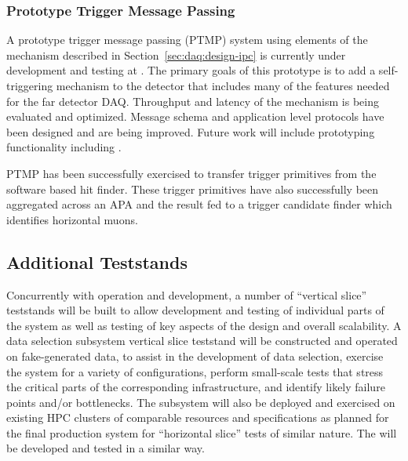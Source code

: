 \subsubsection{Prototype Trigger Message Passing}

A prototype trigger message passing (PTMP) system using elements of the  mechanism described in Section~\ref{sec:daq:design-ipc} is currently under development and testing at .
The primary goals of this prototype is to add a self-triggering mechanism to the  detector that includes many of the features needed for the far detector DAQ.
Throughput and latency of the mechanism is being evaluated and optimized.
Message schema and application level protocols have been designed and are being improved.
Future work will include prototyping  functionality including .

PTMP has been successfully exercised to transfer trigger primitives from the software based hit finder.
These trigger primitives have also successfully been aggregated across an APA and the result fed to a trigger candidate finder which identifies horizontal muons.

\subsection{Additional Teststands}
\label{sec:sp-daq:validation-demonstrators}

Concurrently with  operation and development, a number of
``vertical slice'' teststands will be built to allow 
development and testing of individual parts of the  system
as well as testing of key aspects of the design and overall
scalability. A data selection subsystem vertical slice teststand will be
constructed and operated on fake-generated data, to assist in the
development of data selection, exercise the system for a variety of
configurations, perform small-scale tests that stress the critical
parts of the corresponding infrastructure, 
and identify likely failure points and/or bottlenecks. The subsystem
will also be deployed and exercised on existing HPC clusters of
comparable resources and specifications as planned for the final
production system for ``horizontal slice'' tests of similar nature. The
 will be developed and tested in a similar way.

